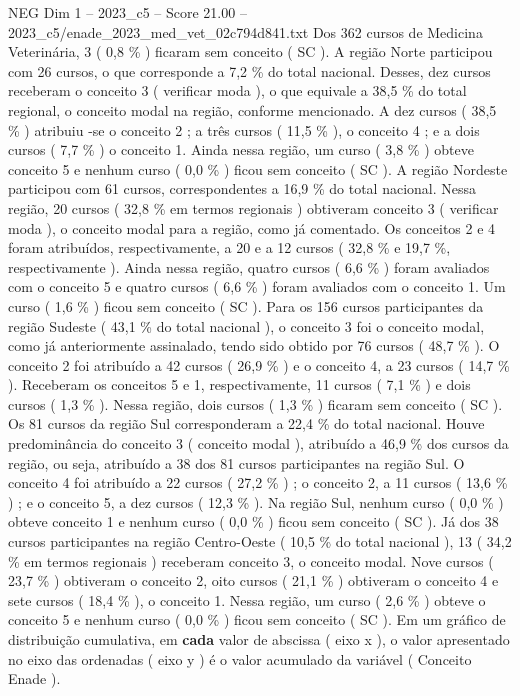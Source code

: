\begin{textsample}{NEG Dim 1 – 2023\_c5 – Score 21.00 – 2023\_c5/enade\_2023\_med\_vet\_02c794d841.txt}
Dos 362 cursos de Medicina Veterinária, 3 ( 0,8 \% ) ficaram sem conceito ( SC ).
A região Norte participou com 26 cursos, o que corresponde a 7,2 \% do total nacional.
Desses, dez cursos receberam o conceito 3 ( verificar moda ), o que equivale a 38,5 \% do total regional, o conceito modal na região, conforme mencionado.
A dez cursos ( 38,5 \% ) atribuiu -se o conceito 2 ; a três cursos ( 11,5 \% ), o conceito 4 ; e a dois cursos ( 7,7 \% ) o conceito 1.
Ainda nessa região, um curso ( 3,8 \% ) obteve conceito 5 e nenhum curso ( 0,0 \% ) ficou sem conceito ( SC ).
A região Nordeste participou com 61 cursos, correspondentes a 16,9 \% do total nacional.
Nessa região, 20 cursos ( 32,8 \% em termos regionais ) obtiveram conceito 3 ( verificar moda ), o conceito modal para a região, como já comentado.
Os conceitos 2 e 4 foram atribuídos, respectivamente, a 20 e a 12 cursos ( 32,8 \% e 19,7 \%, respectivamente ).
Ainda nessa região, quatro cursos ( 6,6 \% ) foram avaliados com o conceito 5 e quatro cursos ( 6,6 \% ) foram avaliados com o conceito 1.
Um curso ( 1,6 \% ) ficou sem conceito ( SC ).
Para os 156 cursos participantes da região Sudeste ( 43,1 \% do total nacional ), o conceito 3 foi o conceito modal, como já anteriormente assinalado, tendo sido obtido por 76 cursos ( 48,7 \% ).
O conceito 2 foi atribuído a 42 cursos ( 26,9 \% ) e o conceito 4, a 23 cursos ( 14,7 \% ).
Receberam os conceitos 5 e 1, respectivamente, 11 cursos ( 7,1 \% ) e dois cursos ( 1,3 \% ).
Nessa região, dois cursos ( 1,3 \% ) ficaram sem conceito ( SC ).
Os 81 cursos da região Sul corresponderam a 22,4 \% do total nacional.
Houve predominância do conceito 3 ( conceito modal ), atribuído a 46,9 \% dos cursos da região, ou seja, atribuído a 38 dos 81 cursos participantes na região Sul.
O conceito 4 foi atribuído a 22 cursos ( 27,2 \% ) ; o conceito 2, a 11 cursos ( 13,6 \% ) ; e o conceito 5, a dez cursos ( 12,3 \% ).
Na região Sul, nenhum curso ( 0,0 \% ) obteve conceito 1 e nenhum curso ( 0,0 \% ) ficou sem conceito ( SC ).
Já dos 38 cursos participantes na região Centro-Oeste ( 10,5 \% do total nacional ), 13 ( 34,2 \% em termos regionais ) receberam conceito 3, o conceito modal.
Nove cursos ( 23,7 \% ) obtiveram o conceito 2, oito cursos ( 21,1 \% ) obtiveram o conceito 4 e sete cursos ( 18,4 \% ), o conceito 1.
Nessa região, um curso ( 2,6 \% ) obteve o conceito 5 e nenhum curso ( 0,0 \% ) ficou sem conceito ( SC ).
Em um gráfico de distribuição cumulativa, em \textbf{cada} valor de abscissa ( eixo x ), o valor apresentado no eixo das ordenadas ( eixo y ) é o valor acumulado da variável ( Conceito Enade ).

\end{textsample}
